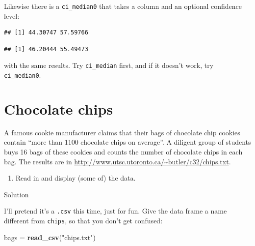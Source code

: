 \documentclass[]{tufte-book}
\newenvironment{Shaded}{}{}
\newcommand{\DataTypeTok}[1]{\textcolor[rgb]{0.56,0.13,0.00}{#1}}
\newcommand{\FloatTok}[1]{\textcolor[rgb]{0.25,0.63,0.44}{#1}}
\newcommand{\KeywordTok}[1]{\textcolor[rgb]{0.00,0.44,0.13}{\textbf{#1}}}
\newcommand{\NormalTok}[1]{#1}
\newcommand{\OperatorTok}[1]{\textcolor[rgb]{0.40,0.40,0.40}{#1}}
\newcommand{\StringTok}[1]{\textcolor[rgb]{0.25,0.44,0.63}{#1}}
\providecommand{\tightlist}{%
  \setlength{\itemsep}{0pt}\setlength{\parskip}{0pt}}
\theoremstyle{definition}
\theoremstyle{definition}
\theoremstyle{definition}
\theoremstyle{remark}
\begin{document}
Likewise there is a \texttt{ci\_median0} that takes a column and an
optional confidence level:

\begin{Shaded}
\end{Shaded}

\begin{verbatim}
## [1] 44.30747 57.59766
\end{verbatim}

\begin{Shaded}
\end{Shaded}

\begin{verbatim}
## [1] 46.20444 55.49473
\end{verbatim}

with the same results. Try \texttt{ci\_median} first, and if it doesn't
work, try \texttt{ci\_median0}.

\hypertarget{chocolate-chips}{%
\section{Chocolate chips}\label{chocolate-chips}}

A famous cookie manufacturer claims that their bags of chocolate chip
cookies contain ``more than 1100 chocolate chips on average''. A
diligent group of students buys 16 bags of these cookies and counts the
number of chocolate chips in each bag. The results are in
\url{http://www.utsc.utoronto.ca/~butler/c32/chips.txt}.

\begin{enumerate}
\def\labelenumi{(\alph{enumi})}
\tightlist
\item
  Read in and display (some of) the data.
\end{enumerate}

Solution

I'll pretend it's a \texttt{.csv} this time, just for fun. Give the data
frame a name different from \texttt{chips}, so that you don't get
confused:

\begin{Shaded}
\begin{Highlighting}[]
\NormalTok{bags =}\StringTok{ }\KeywordTok{read_csv}\NormalTok{(}\StringTok{"chips.txt"}\NormalTok{)}
\end{Highlighting}
\end{Shaded}
\end{document}
